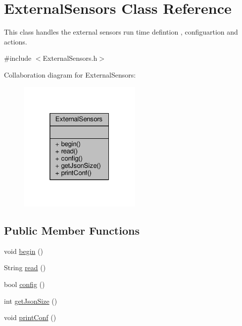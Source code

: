 \hypertarget{class_external_sensors}{}\section{External\+Sensors Class Reference}
\label{class_external_sensors}


This class handles the external sensors run time defintion , configuartion and actions.  




{\ttfamily \#include $<$External\+Sensors.\+h$>$}



Collaboration diagram for External\+Sensors\+:\nopagebreak
\begin{figure}[H]
\begin{center}
\leavevmode
\includegraphics[width=169pt]{class_external_sensors__coll__graph}
\end{center}
\end{figure}
\subsection*{Public Member Functions}
\begin{DoxyCompactItemize}
\item 
void \hyperlink{class_external_sensors_a58ede0d786a86417254708870f04a21e}{begin} ()
\item 
String \hyperlink{class_external_sensors_a53177b81eca3be89508b5511ddcd00fc}{read} ()
\item 
bool \hyperlink{class_external_sensors_a862a4bd11346b37270d0244c2adabe5a}{config} ()
\item 
int \hyperlink{class_external_sensors_a8e3a93efa8f5a0477f300e26084b6625}{get\+Json\+Size} ()
\item 
void \hyperlink{class_external_sensors_a78c2bf55084435dd51d3c559b2d3c6f3}{print\+Conf} ()
\end{DoxyCompactItemize}


